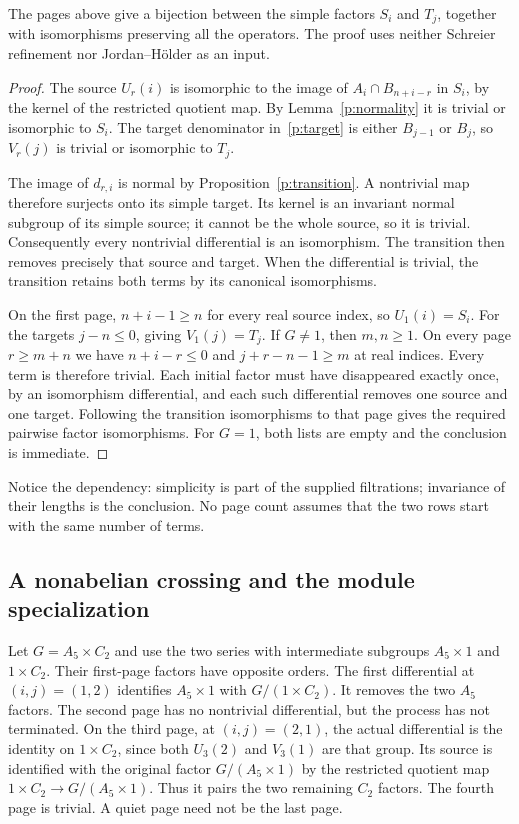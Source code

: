 \begin{theorem}\label{p:cancellation}
The pages above give a bijection between the simple factors $S_i$ and
$T_j$, together with isomorphisms preserving all the operators. The proof
uses neither Schreier refinement nor Jordan--H\"older as an input.
\end{theorem}
\begin{proof}
The source $U_r(i)$ is isomorphic to the image of $A_i\cap B_{n+i-r}$
in $S_i$, by the kernel of the restricted quotient map. By
Lemma~\ref{p:normality} it is trivial or isomorphic to $S_i$.
The target denominator in~\eqref{p:target} is either $B_{j-1}$ or
$B_j$, so $V_r(j)$ is trivial or isomorphic to $T_j$.

The image of $d_{r,i}$ is normal by Proposition~\ref{p:transition}.
A nontrivial map therefore surjects onto its simple target. Its kernel
is an invariant normal subgroup of its simple source; it cannot be the
whole source, so it is trivial. Consequently every nontrivial
differential is an isomorphism. The transition then removes precisely
that source and target. When the differential is trivial, the transition
retains both terms by its canonical isomorphisms.

On the first page, $n+i-1\geq n$ for every real source index, so
$U_1(i)=S_i$. For the targets $j-n\leq0$, giving $V_1(j)=T_j$.
If $G\neq1$, then $m,n\geq1$. On every page $r\geq m+n$ we have
$n+i-r\leq0$ and $j+r-n-1\geq m$ at real indices. Every term is
therefore trivial. Each initial factor must have disappeared exactly
once, by an isomorphism differential, and each such differential removes
one source and one target. Following the transition isomorphisms to that
page gives the required pairwise factor isomorphisms. For $G=1$, both
lists are empty and the conclusion is immediate.
\end{proof}

Notice the dependency: simplicity is part of the supplied filtrations;
invariance of their lengths is the conclusion. No page count assumes
that the two rows start with the same number of terms.

\subsection{A nonabelian crossing and the module specialization}

Let $G=A_5\times C_2$ and use the two series with intermediate subgroups
$A_5\times1$ and $1\times C_2$. Their first-page factors have opposite
orders. The first differential at $(i,j)=(1,2)$ identifies
$A_5\times1$ with $G/(1\times C_2)$. It removes the two $A_5$ factors.
The second page has no nontrivial differential, but the process has not
terminated. On the third page, at $(i,j)=(2,1)$, the actual differential
is the identity on $1\times C_2$, since both $U_3(2)$ and $V_3(1)$
are that group. Its source is identified with the original factor
$G/(A_5\times1)$ by the restricted quotient map
$1\times C_2\to G/(A_5\times1)$. Thus it pairs the two remaining
$C_2$ factors. The fourth page is trivial. A quiet page need not be the
last page.

